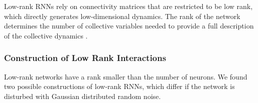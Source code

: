 \documentclass[11pt]{article}
\begin{document}
{	Low-rank RNNs rely on connectivity matrices that are restricted to be low rank, which directly generates low-dimensional dynamics. The rank of the network determines the number of collective variables needed to provide a full description of the collective dynamics \cite{beiran2021shaping}. 
	
	\subsubsection{Construction of Low Rank Interactions} \label{sec:low_rank_construct}
	Low-rank networks have a rank smaller than the number of neurons. We found two possible constructions of low-rank RNNs, which differ if the network is disturbed with Gaussian distributed random noise. 
	
}
\end{document}
